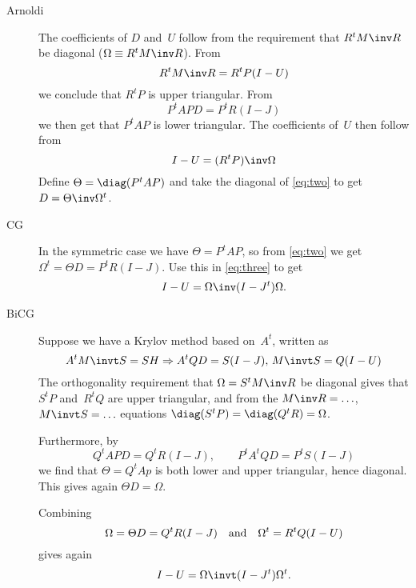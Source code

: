 \begin{description}
\item[Arnoldi]
The coefficients of $D$ and~$U$ follow from the requirement that
$R^tM\inv R$ be diagonal ($\Omega\equiv R^tM\inv R$). From
\begin{equation}R^tM\inv R=R^tP(I-U)\label{eq:one}\end{equation}
we conclude that $R^tP$ is upper triangular. From
\begin{equation}P^tAPD=P^tR(I-J)\label{eq:two}\end{equation}
we then get that $P^tAP$ is lower triangular.
The coefficients of~$U$ then follow from
\begin{equation}I-U=(R^tP)\inv\Omega\label{eq:three}\end{equation}
Define $\Theta=\diag(P^tAP)$ and take the diagonal of \eqref{eq:two}
to get $D=\Theta\inv\Omega^t$.

\item[CG]
In the symmetric case we have $\Theta=P^tAP$, so from \eqref{eq:two}
we get $\Omega^t=\Theta D=P^tR(I-J)$. Use this in \eqref{eq:three} to
get
\begin{equation}I-U=\Omega\inv(I-J^t)\Omega.\end{equation}

\item[BiCG]
Suppose we have a Krylov method based on~$A^t$, written as
\begin{equation}A^tM\invt S=SH\Rightarrow A^tQD=S(I-J),\,M\invt S=Q(I-U)
\end{equation}
The orthogonality requirement that $\Omega=S^tM\inv R$ be diagonal
gives that $S^tP$ and~$R^tQ$ are upper triangular, and from the $M\inv
R=\ldots$, $M\invt S=\ldots$ equations
$\diag(S^tP)=\diag(Q^tR)=\Omega$.

Furthermore, by
\[Q^tAPD=Q^tR(I-J),\qquad P^tA^tQD=P^tS(I-J) \]
we find that $\Theta=Q^tAp$ is both lower and upper triangular, hence
diagonal. This gives again $\Theta D=\Omega$.

Combining
\[\Omega=\Theta D=Q^tR(I-J)\quad\hbox{and}\quad\Omega^t=R^tQ(I-U)\]
gives again
\begin{equation}I-U=\Omega\invt(I-J^t)\Omega^t.\end{equation}

\end{description}

